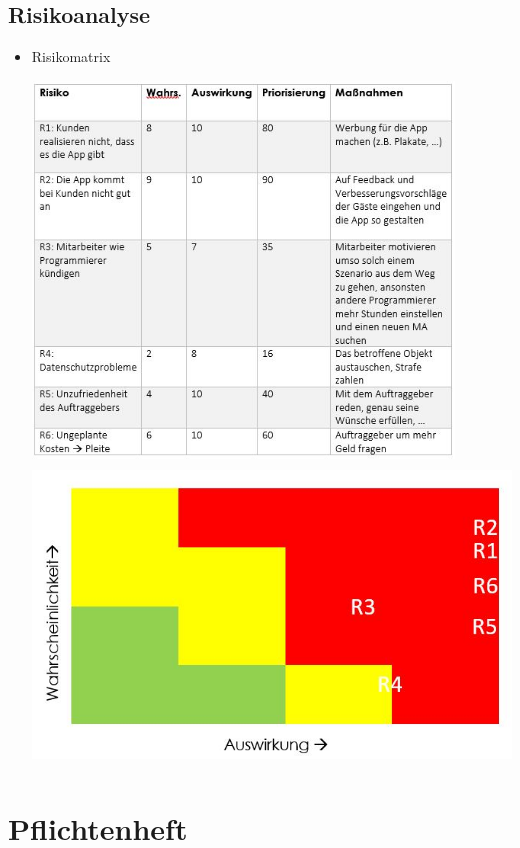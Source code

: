 \subsection{Risikoanalyse}
\begin{itemize}
	\item Risikomatrix
	
	\includegraphics[height=10cm]{Risiko}\\
	\includegraphics[height=8cm]{RMatrix}	
	
\end{itemize}
\section{Pflichtenheft}
